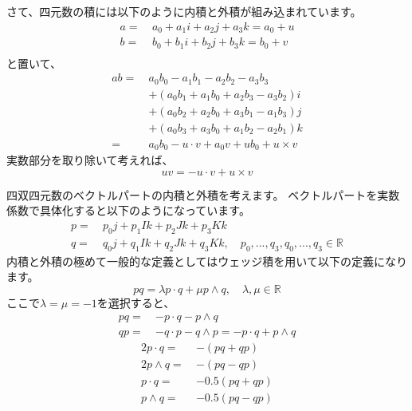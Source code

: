 \documentclass[a4paper,12pt,notitlepage]{jsreport}
\begin{document}
さて、四元数の積には以下のように内積と外積が組み込まれています。
\begin{equation}
  \begin{split}
    a=~&a_0+a_1i+a_2j+a_3k=a_0+u\\
    b=~&b_0+b_1i+b_2j+b_3k=b_0+v\\
  \end{split}
\end{equation}
と置いて、
\begin{equation}
  \begin{split}
    ab=~&a_0b_0-a_1b_1-a_2b_2-a_3b_3\\
    &+(a_0b_1+a_1b_0+a_2b_3-a_3b_2)i\\
    &+(a_0b_2+a_2b_0+a_3b_1-a_1b_3)j\\
    &+(a_0b_3+a_3b_0+a_1b_2-a_2b_1)k\\
    =~&a_0b_0-u\cdot v+a_0v+ub_0+u\times v
  \end{split}
\end{equation}
実数部分を取り除いて考えれば、
\begin{equation}
  uv=-u\cdot v+u\times v
\end{equation}

四双四元数のベクトルパートの内積と外積を考えます。
ベクトルパートを実数係数で具体化すると以下のようになっています。
\begin{equation}
  \begin{split}
    p=~&p_0j+p_1Ik+p_2Jk+p_3Kk\\
    q=~&q_0j+q_1Ik+q_2Jk+q_3Kk,\quad p_0,...,q_3,q_0,...,q_3\in\mathbb{R}
  \end{split}
\end{equation}
内積と外積の極めて一般的な定義としてはウェッジ積を用いて以下の定義になります。
\begin{equation}
  pq=\lambda p\cdot q+\mu p\wedge q,\quad \lambda,\mu\in\mathbb{R}
\end{equation}
ここで$\lambda=\mu=-1$を選択すると、
\begin{equation}
  \begin{split}
    pq=~&-p\cdot q-p\wedge q\\
    qp=~&-q\cdot p-q\wedge p=-p\cdot q+p\wedge q
  \end{split}
\end{equation}
\begin{equation}
  \begin{split}
    2p\cdot q=~&-(pq+qp)\\
    2p\wedge q=~&-(pq-qp)\\
    p\cdot q=~&-0.5(pq+qp)\\
    p\wedge q=~&-0.5(pq-qp)
  \end{split}
\end{equation}
\end{document}
